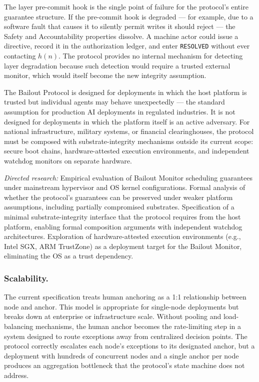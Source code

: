 The \fact{} layer pre-commit hook is the single point of failure for the protocol's entire guarantee structure. If the pre-commit hook is degraded --- for example, due to a software fault that causes it to silently permit writes it should reject --- the Safety and Accountability properties dissolve. A machine actor could issue a directive, record it in the authorization ledger, and enter \texttt{RESOLVED} without ever contacting $h(n)$. The protocol provides no internal mechanism for detecting \fact{} layer degradation because such detection would require a trusted external monitor, which would itself become the new integrity assumption.

The Bailout Protocol is designed for deployments in which the host platform is trusted but individual agents may behave unexpectedly --- the standard assumption for production AI deployments in regulated industries. It is not designed for deployments in which the platform itself is an active adversary. For national infrastructure, military systems, or financial clearinghouses, the protocol must be composed with substrate-integrity mechanisms outside its current scope: secure boot chains, hardware-attested execution environments, and independent watchdog monitors on separate hardware.

\textit{Directed research:} Empirical evaluation of Bailout Monitor scheduling guarantees under mainstream hypervisor and OS kernel configurations. Formal analysis of whether the protocol's guarantees can be preserved under weaker platform assumptions, including partially compromised substrates. Specification of a minimal substrate-integrity interface that the protocol requires from the host platform, enabling formal composition arguments with independent watchdog architectures. Exploration of hardware-attested execution environments (e.g., Intel SGX, ARM TrustZone) as a deployment target for the Bailout Monitor, eliminating the OS as a trust dependency.

\subsubsection{Scalability.}

The current specification treats human anchoring as a 1:1 relationship between node and anchor. This model is appropriate for single-node deployments but breaks down at enterprise or infrastructure scale. Without pooling and load-balancing mechanisms, the human anchor becomes the rate-limiting step in a system designed to route exceptions away from centralized decision points. The protocol correctly escalates each node's exceptions to its designated anchor, but a deployment with hundreds of concurrent nodes and a single anchor per node produces an aggregation bottleneck that the protocol's state machine does not address.

